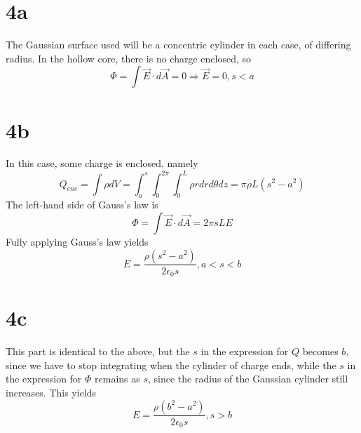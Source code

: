 \documentclass{article}
\begin{document}
\section*{4a}
The Gaussian surface used will be a concentric cylinder in each case, of differing radius. In the hollow core, there is no charge enclosed, so \[\Phi=\int\vec{E}\cdot d\vec{A} = 0\Rightarrow \vec{E}=0, s<a\]
\section*{4b}
In this case, some charge is enclosed, namely \[Q_{enc}=\int\rho dV=\int_a^s\int_0^{2\pi}\int_0^L\rho rdrd\theta dz=\pi\rho L (s^2-a^2)\]
The left-hand side of Gauss's law is \[\Phi=\int\vec{E}\cdot d\vec{A} = 2\pi sLE\] Fully applying Gauss's law yields \[E=\frac{\rho (s^2-a^2)}{2\epsilon_0s}, a<s<b\]
\section*{4c}
This part is identical to the above, but the $s$ in the expression for $Q$ becomes $b$, since we have to stop integrating when the cylinder of charge ends, while the $s$ in the expression for $\Phi$ remains as $s$, since the radius of the Gaussian cylinder still increases. This yields
\[E=\frac{\rho(b^2-a^2)}{2\epsilon_0s}, s>b\]
\end{document}
